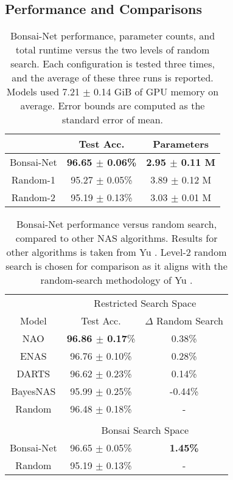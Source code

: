 \documentclass[10pt,twocolumn,letterpaper]{article}
\begin{document}
\subsection{Performance and Comparisons}
\begin{table}[h]
\begin{center}
\begin{tabular}{c|cc}
& Test Acc. & Parameters\\
\hline
Bonsai-Net  & \textbf{96.65  $\pm$ 0.06\%}  & \textbf{2.95 $\pm$ 0.11 M} \\
Random-1   & 95.27  $\pm$ 0.05\% & 3.89  $\pm$ 0.12 M\\
Random-2   & 95.19  $\pm$ 0.13\% & 3.03 $\pm$ 0.01 M
\end{tabular}
\end{center}
\caption{Bonsai-Net performance, parameter counts, and total runtime versus the two levels of random search. Each configuration is tested three times, and the average of these three runs is reported. Models used 7.21 $\pm$ 0.14 GiB of GPU memory on average. Error bounds are computed as the standard error of mean.}
\label{tab:performance}
\end{table}
\begin{table}[h]
\begin{center}
\begin{tabular}{c|cc}
 \multicolumn{1}{c}{} & \multicolumn{2}{c}{Restricted Search Space} \\ 
Model & Test Acc. & $\Delta$ Random Search \\ 
\hline
NAO           		& \textbf{96.86 $\pm$ 0.17}\% 	& 0.38\% \\
ENAS			& 96.76 $\pm$ 0.10\% 		& 0.28\% \\
DARTS       		& 96.62 $\pm$ 0.23\% 		& 0.14\% \\
BayesNAS  		& 95.99 $\pm$ 0.25\%		& -0.44\% \\
Random	  		& 96.48 $\pm$ 0.18\%		& -\\
\multicolumn{3}{c}{} \\[-1em]
 \multicolumn{1}{c}{} & \multicolumn{2}{c}{Bonsai Search Space} \\
\hline
Bonsai-Net 		& 96.65 $\pm$ 0.05\% 	& \textbf{1.45\%} \\
Random	  		& 95.19 $\pm$ 0.13\%	& -\\
\end{tabular}
\end{center}
\caption{Bonsai-Net performance versus random search, compared to other NAS algorithms.  Results for other algorithms is taken from Yu \etal  \cite{yu2019}. Level-2 random search is chosen for comparison as it aligns with the random-search methodology of Yu \etal.}
\label{tab:comp_performance}
\end{table}
\end{document}
